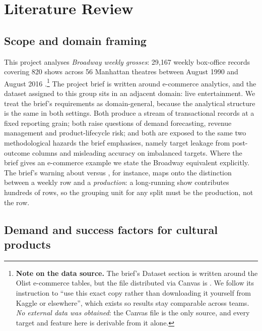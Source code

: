 \section{Literature Review}

\subsection{Scope and domain framing}

This project analyses \emph{Broadway weekly grosses}: 29{,}167 weekly
box-office records covering 820 shows across 56 Manhattan theatres between
August 1990 and August 2016 \citep{corgis2016broadway}.\footnote{%
\textbf{Note on the data source.} The brief's Dataset section is written around
the Olist e-commerce tables, but the file distributed via Canvas is
. We follow its instruction to ``use this exact copy
rather than downloading it yourself from Kaggle or elsewhere'', which exists so
results stay comparable across teams. \emph{No external data was obtained}: the
Canvas file is the only source, and every target and feature here is derivable
from it alone.}
The project brief is written around e-commerce analytics, and the dataset
assigned to this group sits in an adjacent domain: live entertainment. We treat the brief's requirements as
domain-general, because the analytical structure is the same in both settings.
Both produce a stream of transactional records at a fixed reporting grain; both
raise questions of demand forecasting, revenue management and product-lifecycle
risk; and both are exposed to the same two methodological hazards the brief
emphasises, namely target leakage from post-outcome columns and misleading
accuracy on imbalanced targets. Where the brief gives an e-commerce example we
state the Broadway equivalent explicitly. The brief's warning about
 versus , for instance, maps onto
the distinction between a weekly row and a \emph{production}: a long-running
show contributes hundreds of rows, so the grouping unit for any split must be
the production, not the row.

\subsection{Demand and success factors for cultural products}

